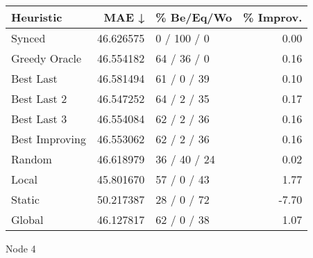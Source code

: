 \begin{tabular}{lrlr}
\toprule
      Heuristic &      MAE ↓ &    \% Be/Eq/Wo & \% Improv. \\
\midrule
         Synced &  46.626575 &   0 / 100 / 0 &      0.00 \\
  Greedy Oracle &  46.554182 &   64 / 36 / 0 &      0.16 \\
      Best Last &  46.581494 &   61 / 0 / 39 &      0.10 \\
    Best Last 2 &  46.547252 &   64 / 2 / 35 &      0.17 \\
    Best Last 3 &  46.554084 &   62 / 2 / 36 &      0.16 \\
 Best Improving &  46.553062 &   62 / 2 / 36 &      0.16 \\
         Random &  46.618979 &  36 / 40 / 24 &      0.02 \\
          Local &  45.801670 &   57 / 0 / 43 &      1.77 \\
         Static &  50.217387 &   28 / 0 / 72 &     -7.70 \\
         Global &  46.127817 &   62 / 0 / 38 &      1.07 \\
\bottomrule
\end{tabular}
\caption{Node 4}
\label{tab:non_lr001_le1_bs2_4}
